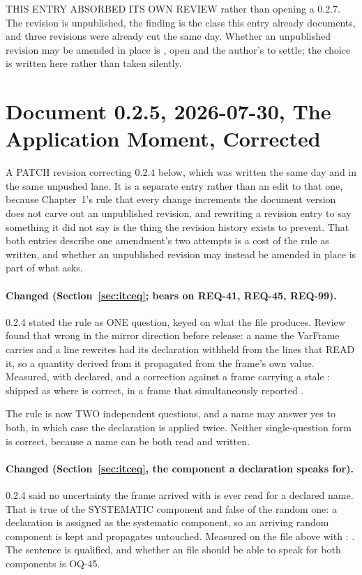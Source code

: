 THIS ENTRY ABSORBED ITS OWN REVIEW rather than opening a 0.2.7. The revision
is unpublished, the finding is the class this entry already documents, and
three revisions were already cut the same day. Whether an unpublished
revision may be amended in place is , open and the
author's to settle; the choice is written here rather than taken silently.

\section*{Document 0.2.5, 2026-07-30, The Application Moment, Corrected}

A PATCH revision correcting 0.2.4 below, which was written the same day and
in the same unpushed lane. It is a separate entry rather than an edit to
that one, because Chapter~1's rule that every change increments the document
version does not carve out an unpublished revision, and rewriting a
revision entry to say something it did not say is the thing the revision
history exists to prevent. That both entries describe one amendment's two
attempts is a cost of the rule as written, and whether an unpublished
revision may instead be amended in place is part of what
 asks.

\paragraph{Changed (Section~\ref{sec:itceq}; bears on REQ-41, REQ-45,
REQ-99).} 0.2.4 stated the rule as ONE question, keyed on what the file
produces. Review found that wrong in the mirror direction before release: a
name the VarFrame carries and a \code{[corrections]} line rewrites had its
declaration withheld from the \code{[equations]} lines that READ it, so a
quantity derived from it propagated from the frame's own value. Measured,
with  declared,  and a correction
 against a frame carrying a stale
:  shipped as  where 
is correct, in a frame that simultaneously reported .

The rule is now TWO independent questions, and a name may answer yes to
both, in which case the declaration is applied twice. Neither
single-question form is correct, because a name can be both read and
written.

\paragraph{Changed (Section~\ref{sec:itceq}, the component a declaration
speaks for).} 0.2.4 said no uncertainty the frame arrived with is ever read
for a declared name. That is true of the SYSTEMATIC component and false of
the random one: a declaration is assigned as the systematic component, so an
arriving random component is kept and propagates untouched. Measured on the
file above with : .
The sentence is qualified, and whether an  file should be able
to speak for both components is OQ-45.

